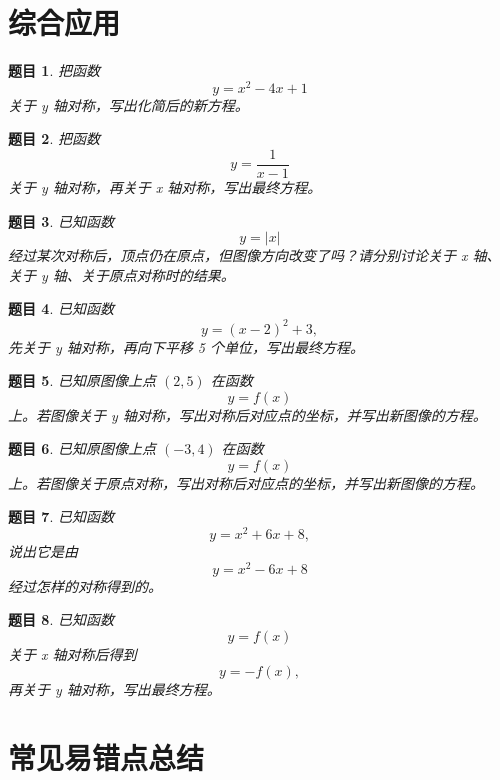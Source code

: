 \documentclass[11pt,a4paper,fontset=fandol]{ctexart}
\theoremstyle{formalexample}
\newtheorem{exercise}{题目}[section]
\begin{document}
\section{综合应用}

\begin{exercise}
把函数
\[
y=x^2-4x+1
\]
关于 y 轴对称，写出化简后的新方程。
\end{exercise}

\begin{exercise}
把函数
\[
y=\frac{1}{x-1}
\]
关于 y 轴对称，再关于 x 轴对称，写出最终方程。
\end{exercise}

\begin{exercise}
已知函数
\[
y=|x|
\]
经过某次对称后，顶点仍在原点，但图像方向改变了吗？请分别讨论关于 x 轴、关于 y 轴、关于原点对称时的结果。
\end{exercise}

\begin{exercise}
已知函数
\[
y=(x-2)^2+3,
\]
先关于 y 轴对称，再向下平移 5 个单位，写出最终方程。
\end{exercise}

\begin{exercise}
已知原图像上点 $(2,5)$ 在函数
\[
y=f(x)
\]
上。若图像关于 y 轴对称，写出对称后对应点的坐标，并写出新图像的方程。
\end{exercise}

\begin{exercise}
已知原图像上点 $(-3,4)$ 在函数
\[
y=f(x)
\]
上。若图像关于原点对称，写出对称后对应点的坐标，并写出新图像的方程。
\end{exercise}

\begin{exercise}
已知函数
\[
y=x^2+6x+8,
\]
说出它是由
\[
y=x^2-6x+8
\]
经过怎样的对称得到的。
\end{exercise}

\begin{exercise}
已知函数
\[
y=f(x)
\]
关于 x 轴对称后得到
\[
y=-f(x),
\]
再关于 y 轴对称，写出最终方程。
\end{exercise}

\newpage
\section{常见易错点总结}
\end{document}
